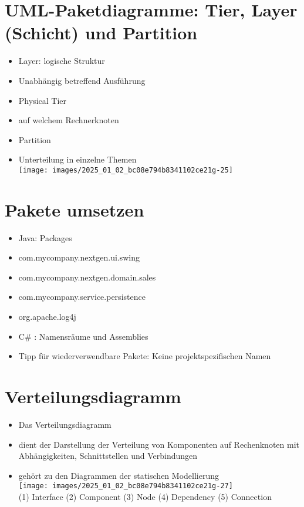 \documentclass[10pt]{article}
\begin{document}
\section*{UML-Paketdiagramme: Tier, Layer (Schicht) und Partition}
\begin{itemize}
  \item Layer: logische Struktur
  \item Unabhängig betreffend Ausführung
  \item Physical Tier
  \item auf welchem Rechnerknoten
  \item Partition
  \item Unterteilung in einzelne Themen\\
\texttt{[image: images/2025\_01\_02\_bc08e794b8341102ce21g-25]}
\end{itemize}

\section*{Pakete umsetzen}
\begin{itemize}
  \item Java: Packages
  \item com.mycompany.nextgen.ui.swing
  \item com.mycompany.nextgen.domain.sales
  \item com.mycompany.service.persistence
  \item org.apache.log4j
  \item C\# : Namensräume und Assemblies
  \item Tipp für wiederverwendbare Pakete: Keine projektspezifischen Namen
\end{itemize}

\section*{Verteilungsdiagramm}
\begin{itemize}
  \item Das Verteilungsdiagramm
  \item dient der Darstellung der Verteilung von Komponenten auf Rechenknoten mit Abhängigkeiten, Schnittstellen und Verbindungen
  \item gehört zu den Diagrammen der statischen Modellierung\\
\texttt{[image: images/2025\_01\_02\_bc08e794b8341102ce21g-27]}\\
(1) Interface (2) Component (3) Node (4) Dependency (5) Connection
\end{itemize}
\end{document}

